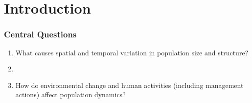 \documentclass[color=usenames,dvipsnames]{beamer}
\begin{document}



















\section{Introduction}






\begin{frame}
\frametitle{Central Questions}
  \large \centering
  \begin{enumerate}[\bf (1)]
    \item What causes spatial and temporal variation in population size
    and structure? \par
    \item[]
    \item<2-> How do environmental change and human activities (including
      management actions) affect population dynamics?
  \end{enumerate}
\end{frame}
\end{document}
